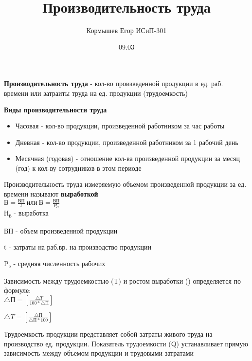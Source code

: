 \documentclass[11pt]{article}
\author{Кормышев Егор ИСиП-301}
\date{09.03}
\title{Производительность труда}
\begin{document}
\maketitle
\tableofcontents

\textbf{Производительность труда} - кол-во произведенной продукции в ед. раб. времени или затраиты труда на ед. продукции (трудоемкость)

\begin{center}
\textbf{Виды производительности труда}
\end{center}

\begin{itemize}
\item Часовая - кол-во продукции, произведенной работником за час работы
\item Дневная - кол-во продукции, произведенной работником за 1 рабочий день
\item Месячная (годовая) - отношение кол-ва произведенной продукции за месяц (год) к кол-ву сотрудников в этом периоде
\end{itemize}

Производительность труда измеряемую объемом произведенной продукции за ед. времени называют \textbf{выработкой} \\[0pt]

$\text{В} = \frac{\text{ВП}}{t} \ \text{или} \ \text{В} = \frac{\text{ВП}}{P_C}$
\\

Н\textsubscript{в} - выработка

ВП - объем произведенной продукции

t - затраты на раб.вр. на производство продукции

P\textsubscript{c} - средняя численность рабочих

Зависимость между трудоемкостью (\triangle T) и ростом выработки (\triangle {}) определяется по формуле: \\[0pt]

\begin{math}
  \triangle \text{П} = [\frac{\triangle T}{100 * \triangle \text{П}}]
\end{math}


\begin{math}
  \triangle T = [\frac{\triangle \text{П}}{\triangle \text{П} * 100}]
\end{math}

Трудоемкость продукции представляет собой затраты живого труда на производство ед. продукции. Показатель трудоемкости (Q) устанавливает прямую зависимость между объемом продукции и трудовыми затратами \\[0pt]
\end{document}
